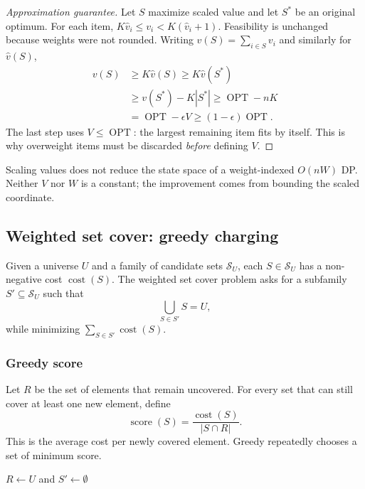 \documentclass[10pt]{article}
\theoremstyle{definition}
\newcommand{\OPT}{\operatorname{OPT}}
\begin{document}
\begin{proof}[Approximation guarantee]
Let $S$ maximize scaled value and let $S^*$ be an original optimum. For each item,
$K\hat v_i\le v_i<K(\hat v_i+1)$. Feasibility is unchanged because weights were not rounded.
Writing $v(S)=\sum_{i\in S}v_i$ and similarly for $\hat v(S)$,
\begin{align*}
v(S)&\ge K\hat v(S)\ge K\hat v(S^*)\\
&\ge v(S^*)-K|S^*|\ge\OPT-nK\\
&=\OPT-\epsilon V\ge(1-\epsilon)\OPT.
\end{align*}
The last step uses $V\le\OPT$: the largest remaining item fits by itself. This is why
overweight items must be discarded \emph{before} defining $V$.
\end{proof}
Scaling values does not reduce the state space of a weight-indexed $O(nW)$ DP. Neither
$V$ nor $W$ is a constant; the improvement comes from bounding the scaled coordinate.



\subsection{Weighted set cover: greedy charging}\label{gre:setcover}
Given a universe $U$ and a family of candidate sets $\mathcal{S}_U$, each
$S\in\mathcal{S}_U$ has a non-negative cost $\operatorname{cost}(S)$. The
weighted set cover problem asks for a subfamily $S'\subseteq\mathcal{S}_U$
such that
\[
  \bigcup_{S\in S'}S=U,
\]
while minimizing $\sum_{S\in S'}\operatorname{cost}(S)$.

\subsubsection*{Greedy score}
Let $R$ be the set of elements that remain uncovered. For every set that can
still cover at least one new element, define
\[
  \operatorname{score}(S)=
  \frac{\operatorname{cost}(S)}{|S\cap R|}.
\]
This is the average cost per newly covered element. Greedy repeatedly chooses
a set of minimum score.


\begin{algorithm}[H]
$R\gets U$ and $S'\gets\emptyset$\;
\;
\end{algorithm}
\end{document}
